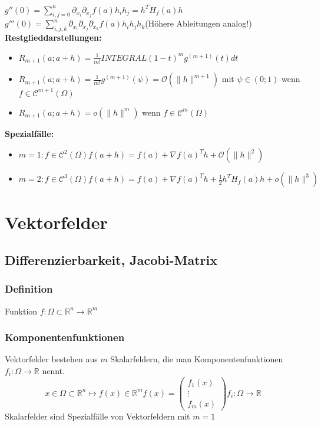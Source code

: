 \documentclass[german]{latex4ei/latex4ei_sheet}
\begin{document}
$g''(0)=\sum_{i,j=0}^n \partial_{x_i} \partial_{x_j} f(a) h_i h_j = h^T H_f(a) h$\\
$g'''(0)=\sum_{i,j,k}^n \partial _{x_i} \partial_{x_j} \partial_{x_k} f(a) h_i h_j h_k$(H\"ohere Ableitungen analog!)\\
\textbf{Restglieddarstellungen:}
\begin{itemize}
\item $R_{m+1}(a; a+h)=\frac{1}{m!} INTEGRAL (1-t)^m g^{(m+1)}(t) dt$
\item $R_{m+1}(a; a+h)=\frac{1}{m!}g^{(m+1)}(\psi)=\mathcal{O}(\|h\|^{m+1})$ mit $\psi \in (0;1)$ wenn $f \in \mathcal{C}^{m+1}(\Omega)$
\item $R_{m+1}(a; a+h)=o(\|h\|^{m})$ wenn $f \in \mathcal{C}^{m}(\Omega)$
\end{itemize}
\textbf{Spezialf\"alle:}
\begin{itemize}
\item $m=1: f \in \mathcal{C}^2(\Omega) f(a+h)=f(a)+\nabla f(a)^T h + \mathcal{O}(\|h\|^2)$ 
\item $m=2: f \in \mathcal{C}^3(\Omega) f(a+h)=f(a)+\nabla f(a)^T h + \frac{1}{2} h^T H_f(a) h + o(\|h\|^3)$
\end{itemize}


\section{Vektorfelder}
\subsection{Differenzierbarkeit, Jacobi-Matrix}
\subsubsection*{Definition}
Funktion $f:\Omega \subset \mathbb{R}^n \rightarrow \mathbb{R}^m$
\subsubsection*{Komponentenfunktionen}
Vektorfelder bestehen aus $m$ Skalarfeldern, die man Komponentenfunktionen $f_i:\Omega \rightarrow \mathbb{R}$ nennt.\\
\[x \in \Omega \subset \mathbb{R}^n \mapsto f(x) \in \mathbb{R}^m f(x)=\begin{pmatrix} f_1(x) \\ \vdots \\ f_m(x)\end{pmatrix} f_i: \Omega \rightarrow \mathbb{R}\]
Skalarfelder sind Spezialf\"alle von Vektorfeldern mit $m=1$\\
\end{document}
